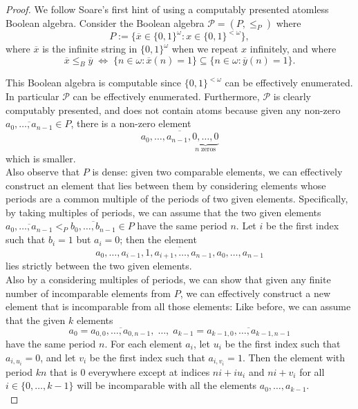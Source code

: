\documentclass{article}
\begin{document}
  \begin{proof}
    We follow Soare's first hint of using a computably presented atomless
    Boolean algebra. Consider the Boolean algebra $\mathcal{P}=(P,\leq_P)$
    where
    \[P:= \{\overline{x}\in \{0,1\}^\omega: x\in \{0,1\}^{<\omega}\},\]
    where $\overline{x}$ is the infinite string in $\{0,1\}^\omega$ when we
    repeat $x$ infinitely, and where
    \[\overline{x} \leq_B\overline{y}\; \Leftrightarrow\; \{n\in\omega:
    \overline{x}(n)=1\} \subseteq \{n\in\omega: \overline{y}(n)=1\}.\]

    This Boolean algebra is computable since $\{0,1\}^{<\omega}$ can be
    effectively enumerated. In particular $\mathcal{P}$ can be effectively
    enumerated. Furthermore, $\mathcal{P}$ is clearly computably presented,
    and does not contain atoms because given any non-zero
    $\overline{a_0,\ldots,a_{n-1}}\in P$, there is a non-zero element
    \[\overline{a_0,\ldots,a_{n-1},\underbrace{0,\ldots,0}_{n\;
    \text{zeros}}}\]
    which is smaller. \\

    Also observe that $P$ is dense: given two comparable
    elements, we can effectively construct an element that lies between
    them by considering elements whose periods are a common multiple of the
    periods of two given elements. Specifically, by taking multiples of
    periods, we can assume that the two given elements
    $\overline{a_0,\ldots,a_{n-1}} <_P\overline{b_0,\ldots,b_{n-1}}\in P$
    have the same period $n$. Let $i$ be the first index such that $b_i=1$
    but $a_i=0$; then the element
    \[\overline{a_0,\ldots,a_{i-1},1,a_{i+1},\ldots,a_{n-1},
    a_0,\ldots,a_{n-1}}\]
    lies strictly between the two given elements. \\

    Also by a considering multiples of periods, we can show
    that given any finite number of incomparable elements from $P$, we can
    effectively construct a new element that is incomparable from all those
    elements: Like before, we can assume that the given $k$ elements
    \[a_0=\overline{a_{0,0},\ldots,a_{0,n-1}},\; \ldots,\;
    a_{k-1}=\overline{a_{k-1,0},\ldots,a_{k-1,n-1}}\]
    have the same period $n$. For each element $a_i$, let $u_i$ be the
    first index such that $a_{i,u_i}=0$, and let $v_i$ be the
    first index such that $a_{i,v_i}=1$. Then the element with period $kn$
    that is 0 everywhere except at indices $ni+iu_i$ and $ni+v_i$ for all
    $i\in\{0,\ldots,k-1\}$ will be incomparable with all the elements
    $a_0,\ldots,a_{k-1}$. \\


\end{proof}
\end{document}
